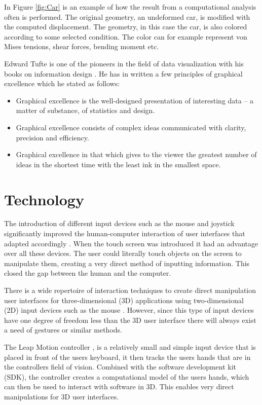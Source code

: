 In Figure \ref{fig:Car} is an example of how the result from a computational analysis often is performed. The original geometry, an undeformed car, is modified with the computed displacement. The geometry, in this case the car, is also colored according to some selected condition. The color can for example represent von Mises tensions, shear forces, bending moment etc. 

Edward Tufte is one of the pioneers in the field of data visualization with his books on information design \cite{tufte1997visual, tufte1990envisioning, tufte2001the}. He has in \cite{tufte2001the} written a few principles of graphical excellence which he stated as follows:

\begin{itemize} 
\item Graphical excellence is the well-designed presentation of interesting data – a matter of substance, of statistics and design.
\item Graphical excellence consists of complex ideas communicated with clarity, precision and efficiency.
\item Graphical excellence in that which gives to the viewer the greatest number of ideas in the shortest time with the least ink in the smallest space.
\end{itemize} 

\section{Technology}
The introduction of different input devices such as the mouse and joystick significantly improved the human-computer interaction of user interfaces that adapted accordingly \cite{Sears1990}. When the touch screen was introduced it had an advantage over all these devices. The user could literally touch objects on the screen to manipulate them, creating a very direct method of inputting information\cite{Sears1990}. This closed the gap between the human and the computer.

There is a wide repertoire of interaction techniques to create direct manipulation user interfaces for three-dimensional (3D) applications using two-dimensional (2D) input devices such as the mouse \cite{Nielson:1987:DMT:319120.319134}. However, since this type of input devices have one degree of freedom less than the 3D user interface there will always exist a need of gestures or similar methods. 

The Leap Motion controller \cite{LeapMotion2013}, is a relatively small and simple input device that is placed in front of the users keyboard, it then tracks the users hands that are in the controllers field of vision. Combined with the software development kit (SDK), the controller creates a computational model of the users hands, which can then be used to interact with software in 3D. This enables very direct manipulations for 3D user interfaces.

